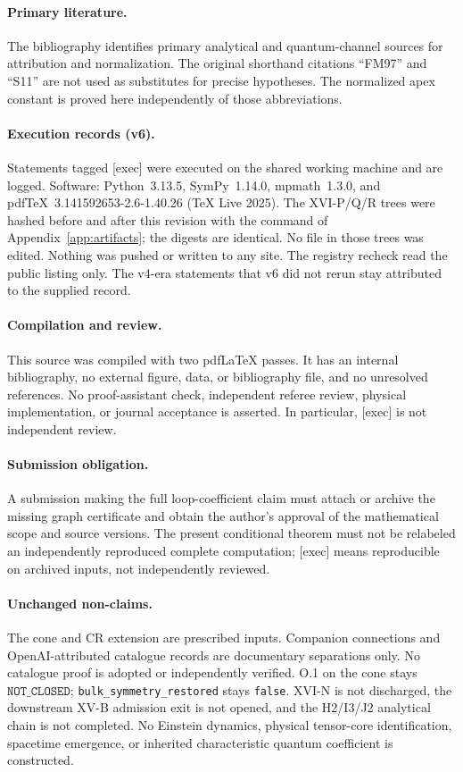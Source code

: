 \documentclass[11pt,a4paper]{article}
\newcommand{\loc}[1]{\nolinkurl{#1}}
\newcommand{\NOTCLOSED}{\texttt{NOT\_CLOSED}}
\theoremstyle{plain}
\theoremstyle{definition}
\theoremstyle{remark}
\numberwithin{equation}{section}
\begin{document}
\paragraph{Primary literature.}
The bibliography identifies primary analytical and quantum-channel
sources for attribution and normalization.
The original shorthand citations ``FM97'' and ``S11'' are not used
as substitutes for precise hypotheses.
The normalized apex constant is proved here independently of those
abbreviations.

\paragraph{Execution records (v6).}
Statements tagged \textsf{[exec]} were executed on the shared
working machine and are logged.
Software: Python~3.13.5, SymPy~1.14.0, mpmath~1.3.0, and
pdfTeX~3.141592653-2.6-1.40.26 (TeX Live 2025).
The XVI-P/Q/R trees were hashed before and after this revision with
the command of Appendix~\ref{app:artifacts}; the digests are
identical.
No file in those trees was edited.
Nothing was pushed or written to any site.
The registry recheck read the public listing only.
The v4-era statements that v6 did not rerun stay attributed to
the supplied record.

\paragraph{Compilation and review.}
This source was compiled with two pdfLaTeX passes. It has an
internal bibliography, no external figure, data, or bibliography
file, and no unresolved references.
No proof-assistant check, independent referee review, physical
implementation, or journal acceptance is asserted.
In particular, \textsf{[exec]} is not independent review.

\paragraph{Submission obligation.}
A submission making the full loop-coefficient claim must attach or
archive the missing graph certificate and obtain the author's
approval of the mathematical scope and source versions.
The present conditional theorem must not be relabeled an
independently reproduced complete computation; \textsf{[exec]} means
reproducible on archived inputs, not independently reviewed.

\paragraph{Unchanged non-claims.}
The cone and CR extension are prescribed inputs.
Companion connections and OpenAI-attributed catalogue records
are documentary separations only.
No catalogue proof is adopted or independently verified.
O.1 on the cone stays \(\NOTCLOSED\);
\loc{bulk_symmetry_restored} stays \texttt{false}.
XVI-N is not discharged, the downstream XV-B admission exit is
not opened, and the H2/I3/J2 analytical chain is not completed.
No Einstein dynamics, physical tensor-core identification,
spacetime emergence, or inherited characteristic quantum
coefficient is constructed.
\end{document}
